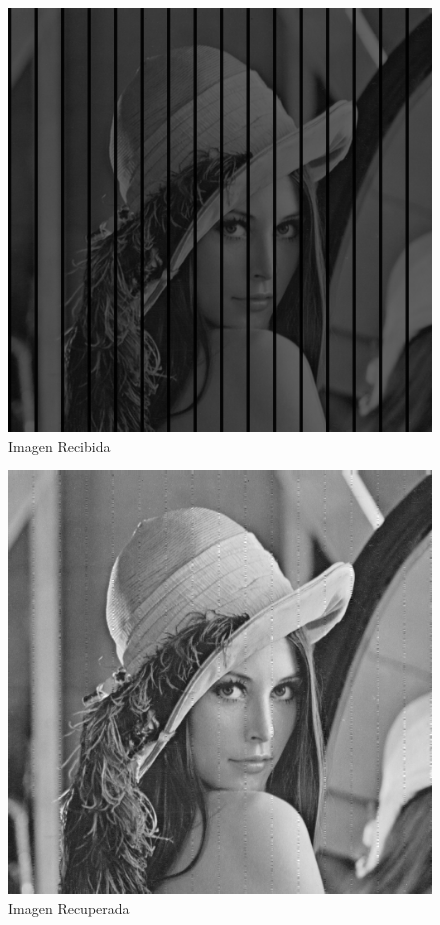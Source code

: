 \documentclass{article}
\begin{document}
\begin{multicols}{2}
\begin{figure}[H]
\centering
\includegraphics[scale=0.2]{../img/received_part6_3c.png}
\caption{Imagen Recibida}

\end{figure}

\begin{figure}[H]
\centering
\includegraphics[scale=0.2]{../img/corrected_part6_3c.png}
\caption{Imagen Recuperada}


\end{figure}
\end{multicols}
\end{document}
